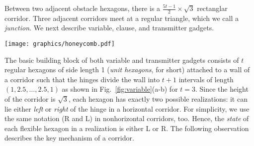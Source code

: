 Between two adjacent obstacle hexagons, there is a $\frac{5t-1}{2}\times \sqrt{3}$ rectanglar corridor.  %
Three adjacent corridors meet at a regular triangle, which we call a \emph{junction}. 
We next describe variable, clause, and transmitter gadgets.

\begin{minipage}{\linewidth}
\begin{center}
\texttt{[image: graphics/honeycomb.pdf]}
\label{fig:honeycomb}
\end{center}
\end{minipage}

The basic building block of both variable and transmitter gadgets consists of $t$ regular hexagons of side length 1 (\emph{unit hexagons}, for short) attached to a wall of a corridor such that the hinges divide the wall into $t+1$ intervals of length $(1,2.5,\ldots ,2.5,1)$ as shown in Fig.~\ref{fig:variable}(a-b) for $t=3$. 
Since the height of the corridor is $\sqrt{3}$, each hexagon has exactly two possible realizations: it can lie either \emph{left} or \emph{right} of the hinge in a horizontal corridor. 
For simplicity, we use the same notation (R and L) in nonhorizontal corridors, too. 
Hence, the \emph{state} of each flexible hexagon in a realization is either L or R. The following observation describes the key mechanism of a corridor.

